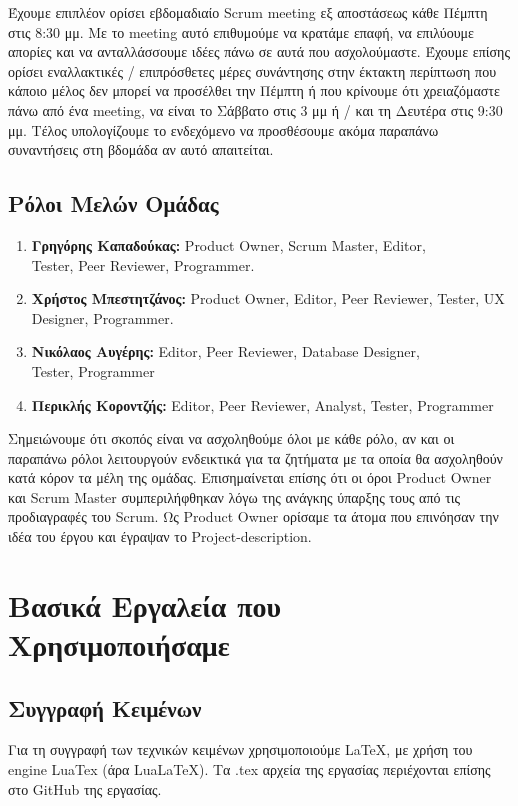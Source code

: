 \documentclass[12pt,a4paper]{article}
\begin{document}
Έχουμε επιπλέον ορίσει εβδομαδιαίο Scrum meeting εξ αποστάσεως κάθε Πέμπτη στις 8:30 μμ. Με το meeting αυτό επιθυμούμε να κρατάμε επαφή, να επιλύουμε απορίες και να ανταλλάσσουμε ιδέες πάνω σε αυτά που ασχολούμαστε. Έχουμε επίσης ορίσει εναλλακτικές / επιπρόσθετες μέρες συνάντησης στην έκτακτη περίπτωση που κάποιο μέλος δεν μπορεί να προσέλθει την Πέμπτη ή που κρίνουμε ότι χρειαζόμαστε πάνω από ένα meeting, να είναι το Σάββατο στις 3 μμ ή / και τη Δευτέρα στις 9:30 μμ. Τέλος υπολογίζουμε το ενδεχόμενο να προσθέσουμε ακόμα παραπάνω συναντήσεις στη βδομάδα αν αυτό απαιτείται.

\subsection{Ρόλοι Μελών Ομάδας}

\begin{enumerate}
	\item \textbf{Γρηγόρης Καπαδούκας:} Product Owner, Scrum Master, Editor,\\ Tester, Peer Reviewer, Programmer.
	\item \textbf{Χρήστος Μπεστητζάνος:} Product Owner, Editor, Peer Reviewer, Tester, UX Designer, Programmer.
	\item \textbf{Νικόλαος Αυγέρης:} Editor, Peer Reviewer, Database Designer,\\ Tester, Programmer
	\item \textbf{Περικλής Κοροντζής:} Editor, Peer Reviewer, Analyst, Tester, Programmer
\end{enumerate}

Σημειώνουμε ότι σκοπός είναι να ασχοληθούμε όλοι με κάθε ρόλο, αν και οι παραπάνω ρόλοι λειτουργούν ενδεικτικά για τα ζητήματα με τα οποία θα ασχοληθούν κατά κόρον τα μέλη της ομάδας. Επισημαίνεται επίσης ότι οι όροι Product Owner και Scrum Master συμπεριλήφθηκαν λόγω της ανάγκης ύπαρξης τους από τις προδιαγραφές του Scrum. Ως Product Owner ορίσαμε τα άτομα που επινόησαν την ιδέα του έργου και έγραψαν το Project-description.

\section{Βασικά Εργαλεία που Χρησιμοποιήσαμε}
\label{Βασικά Εργαλεία που Χρησιμοποιήσαμε}

\subsection{Συγγραφή Κειμένων}
Για τη συγγραφή των τεχνικών κειμένων χρησιμοποιούμε LaTeX, με χρήση του engine LuaTex (άρα LuaLaTeX). Τα .tex αρχεία της εργασίας περιέχονται επίσης στο GitHub της εργασίας.
\end{document}
